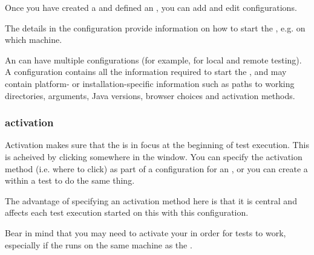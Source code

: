 


Once you have created a \gdproject{}  and defined an \gdaut{} , you can add and edit \gdaut{} configurations. 

The details in the \gdaut{} configuration provide information on how to start the \gdaut{}, e.g. on which machine. 

An \gdaut{} can have multiple configurations (for example, for local and remote testing). A configuration contains all the information required to start the \gdaut{}, and may contain platform- or installation-specific information such as paths to working directories, \gdaut{} arguments, Java versions, browser choices and activation methods. 


\subsubsection{\gdaut{} activation}
\label{TasksAUTActivation}

Activation makes sure that the  \gdaut{} is in focus at the beginning of test execution. This is acheived by clicking somewhere in the \gdaut{} window. You can specify the activation method (i.e. where to click) as part of a configuration for an \gdaut{}, or you can create a \gdstep{} within a test to do the same thing. 

The advantage of specifying an activation method here is that it is central and affects each test execution started on this \gdaut{} with this configuration. 

Bear in mind that you may need to activate your \gdaut{} in order for tests to work, especially if the \gdaut{} runs on the same machine as the \ite{}. 
